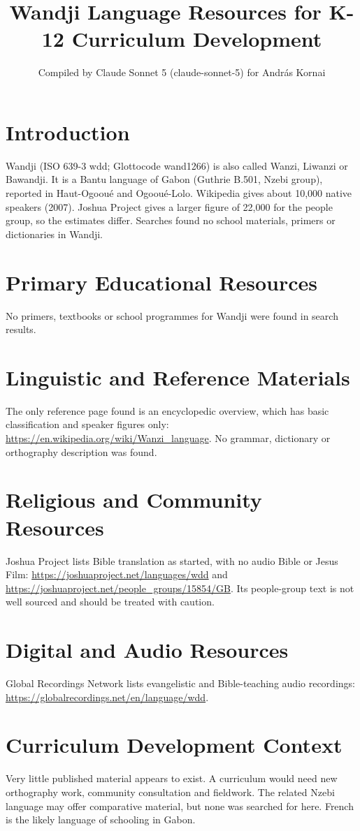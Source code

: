 \documentclass[12pt]{article}
\title{Wandji Language Resources for K-12 Curriculum Development}
\author{Compiled by Claude Sonnet 5 (claude-sonnet-5) for Andr\'as Kornai}
\date{}
\begin{document}
\maketitle

\section{Introduction}
Wandji (ISO 639-3 wdd; Glottocode wand1266) is also called Wanzi, Liwanzi or Bawandji. It is a Bantu language of Gabon (Guthrie B.501, Nzebi group), reported in Haut-Ogoou\'e and Ogoou\'e-Lolo. Wikipedia gives about 10,000 native speakers (2007). Joshua Project gives a larger figure of 22,000 for the people group, so the estimates differ. Searches found no school materials, primers or dictionaries in Wandji.

\section{Primary Educational Resources}
No primers, textbooks or school programmes for Wandji were found in search results.

\section{Linguistic and Reference Materials}
The only reference page found is an encyclopedic overview, which has basic classification and speaker figures only: \url{https://en.wikipedia.org/wiki/Wanzi_language}. No grammar, dictionary or orthography description was found.

\section{Religious and Community Resources}
Joshua Project lists Bible translation as started, with no audio Bible or Jesus Film: \url{https://joshuaproject.net/languages/wdd} and \url{https://joshuaproject.net/people_groups/15854/GB}. Its people-group text is not well sourced and should be treated with caution.

\section{Digital and Audio Resources}
Global Recordings Network lists evangelistic and Bible-teaching audio recordings: \url{https://globalrecordings.net/en/language/wdd}.

\section{Curriculum Development Context}
Very little published material appears to exist. A curriculum would need new orthography work, community consultation and fieldwork. The related Nzebi language may offer comparative material, but none was searched for here. French is the likely language of schooling in Gabon.
\end{document}
